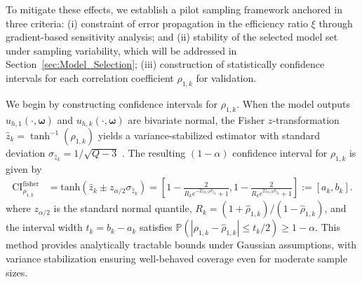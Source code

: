 To mitigate these effects, we establish a pilot sampling framework anchored in three criteria: (i) constraint of error propagation in the efficiency ratio $\xi$ through gradient-based sensitivity analysis; and (ii) stability of the selected model set under sampling variability, which will be addressed in Section~\ref{sec:Model_Selection}; (iii) construction of statistically confidence intervals for each correlation coefficient $\rho_{1,k}$ for validation.


We begin by constructing confidence intervals for $\rho_{1,k}$. When the model outputs $u_{h,1}(\cdot, \boldsymbol{\omega})$ and $u_{h,k}(\cdot, \boldsymbol{\omega})$ are bivariate normal, the Fisher $z$-transformation $\widehat z_k = \tanh^{-1}(\widehat \rho_{1,k})$ yields a variance-stabilized estimator with standard deviation $\sigma_{\widehat z_k} = 1/\sqrt{Q - 3}$ \cite{BiHi:2017,BoWr:1998, FiHaPe:1957,Fi:1915, Fi:1921}. The resulting $(1 - \alpha)$ confidence interval for $\rho_{1,k}$ is given by
%
\begin{align}
    \label{eq:Confidence_Interval_fisher}
    \text{CI}_{\rho_{1,k}}^{\text{fisher}} &= \text{tanh}\left(\widehat z_k \pm  z_{\alpha/2}\sigma_{\widehat z_k}\right)
    =\left[1-\frac{2}{R_k e^{-2z_{\alpha/2}\sigma_{\widehat z_k}}+1}, 1-\frac{2}{R_k e^{2z_{\alpha/2}\sigma_{\widehat z_k}}+1}\right] := [a_k,b_k].
\end{align}
%
where $z_{\alpha/2}$ is the standard normal quantile, $R_k = (1+\widehat\rho_{1,k})/(1-\widehat\rho_{1,k})$, and the interval width $t_k = b_k - a_k$ satisfies $\mathbb{P}(|\rho_{1,k} - \widehat{\rho}_{1,k}| \leq t_k/2) \geq 1 - \alpha$. This method provides analytically tractable bounds under Gaussian assumptions, with variance stabilization ensuring well-behaved coverage even for moderate sample sizes.

